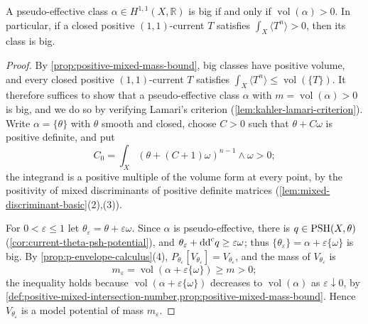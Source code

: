\begin{theorem}\label{thm:positive-nonpluripolar-mass-bigness}
A pseudo-effective class $\alpha\in H^{1,1}(X,\mathbb R)$ is big if and only if $\operatorname{vol}(\alpha)>0$. In particular, if a closed positive $(1,1)$-current $T$ satisfies $\int_X\langle T^n\rangle>0$, then its class is big.
\end{theorem}
\begin{proof}
By \cref{prop:positive-mixed-mass-bound}, big classes have positive volume, and every closed positive $(1,1)$-current $T$ satisfies $\int_X\langle T^n\rangle\leq\operatorname{vol}(\{T\})$. It therefore suffices to show that a pseudo-effective class $\alpha$ with $m=\operatorname{vol}(\alpha)>0$ is big, and we do so by verifying Lamari's criterion (\cref{lem:kahler-lamari-criterion}). Write $\alpha=\{\theta\}$ with $\theta$ smooth and closed, choose $C>0$ such that $\theta+C\omega$ is positive definite, and put
\[
 C_0=\int_X(\theta+(C+1)\omega)^{n-1}\wedge\omega>0;
\]
the integrand is a positive multiple of the volume form at every point, by the positivity of mixed discriminants of positive definite matrices (\cref{lem:mixed-discriminant-basic}(2),(3)).

For $0<\varepsilon\leq1$ let $\theta_\varepsilon=\theta+\varepsilon\omega$. Since $\alpha$ is pseudo-effective, there is $q\in\mathrm{PSH}(X,\theta)$ (\cref{cor:current-theta-psh-potential}), and $\theta_\varepsilon+\mathrm{dd}^{\mathrm{c}} q\geq\varepsilon\omega$; thus $\{\theta_\varepsilon\}=\alpha+\varepsilon\{\omega\}$ is big. By \cref{prop:p-envelope-calculus}(4), $P_{\theta_\varepsilon}[V_{\theta_\varepsilon}]=V_{\theta_\varepsilon}$, and the mass of $V_{\theta_\varepsilon}$ is
\[
 m_\varepsilon=\operatorname{vol}(\alpha+\varepsilon\{\omega\})
                                                        \geq m>0;
\]
the inequality holds because $\operatorname{vol}(\alpha+\varepsilon\{\omega\})$ decreases to $\operatorname{vol}(\alpha)$ as $\varepsilon\downarrow0$, by \cref{def:positive-mixed-intersection-number,prop:positive-mixed-mass-bound}. Hence $V_{\theta_\varepsilon}$ is a model potential of mass $m_\varepsilon$.


\end{proof}
